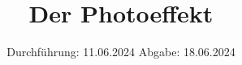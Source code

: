 

\subject{V500}
\title{Der Photoeffekt}
\date{%
  Durchführung: 11.06.2024
  \hspace{3em}
  Abgabe: 18.06.2024
}



\maketitle
\thispagestyle{empty}
\tableofcontents
\newpage






\printbibliography{}
\appendix
\setcounter{secnumdepth}{0}

